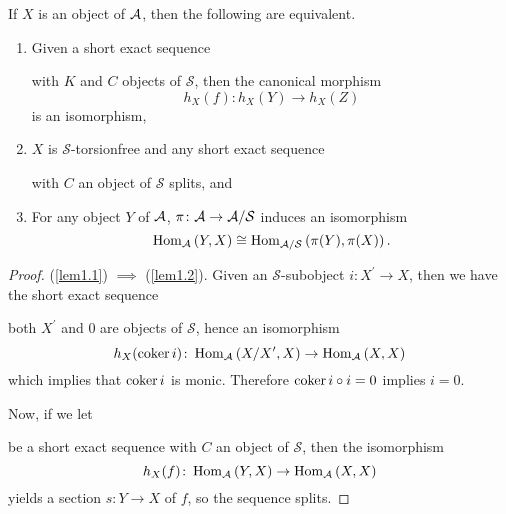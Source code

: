 \documentclass[dissertation.tex]{subfiles}
\begin{document}
\begin{lem}\label{lem1}
  If $X$ is an object of $\mathcal{A}$, then the following are equivalent.
  \begin{enumerate}
  \item\label{lem1.1}
    Given a short exact sequence 
    \begin{center}
    \end{center}
    with $K$ and $C$ objects of $\mathcal{S}$, then the canonical morphism
    $$h_X(f) \colon h_X(Y) \rightarrow h_X(Z)$$
    is an isomorphism,
  \item\label{lem1.2}
    $X$ is $\mathcal{S}$-torsionfree and 
    any short exact sequence 
    \begin{center}
    \end{center}
    with $C$ an object of $\mathcal{S}$ splits, and
  \item\label{lem1.3}
    For any object $Y$ of $\mathcal{A}$, $\pi \colon \mathcal{A} \rightarrow \mathcal{A}/\mathcal{S}$ induces an isomorphism
    $$\operatorname{Hom}_{\mathcal{A}}\left(Y, X\right) \cong \operatorname{Hom}_{\mathcal{A}/\mathcal{S}}\left(\pi(Y), \pi(X)\right).$$
  \end{enumerate}
  
  \begin{proof}
    (\ref{lem1.1}) $\implies$ (\ref{lem1.2}).  Given an $\mathcal{S}$-subobject $i \colon X^\prime \rightarrow X$, then we have the short exact sequence
    \begin{center}
    \end{center}
    both $X^\prime$ and $0$ are objects of $\mathcal{S}$, hence an isomorphism
    $$h_X(\operatorname{coker}{i}) \colon \operatorname{Hom}_{\mathcal{A}}\left(X/X^\prime, X\right) \rightarrow \operatorname{Hom}_{\mathcal{A}}\left(X,X\right)$$
    which implies that $\operatorname{coker}{i}$ is monic.
    Therefore $\operatorname{coker}{i} \circ i = 0$ implies $i = 0$.

    Now, if we let 
    \begin{center}
    \end{center}
    be a short exact sequence with $C$ an object of $\mathcal{S}$, then the isomorphism
    $$h_X(f) \colon \operatorname{Hom}_{\mathcal{A}}\left(Y,X\right) \rightarrow \operatorname{Hom}_{\mathcal{A}}\left(X,X\right)$$
    yields a section $s \colon Y \rightarrow X$ of $f$, so the sequence splits.


\end{proof}
\end{lem}
\end{document}
